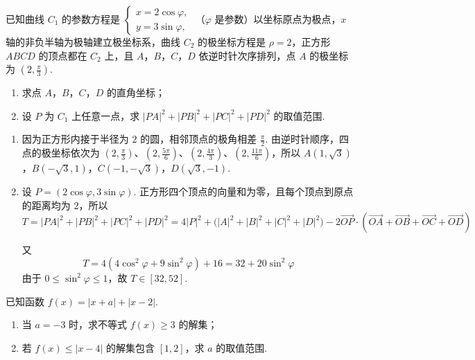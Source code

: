 \begin{problem}
已知曲线 \(C_1\) 的参数方程是 \(\begin{cases}
x = 2\cos \varphi,\\
y = 3\sin \varphi,
\end{cases}\) （\(\varphi\) 是参数）以坐标原点为极点，\(x\) 轴的非负半轴为极轴建立极坐标系，曲线 \(C_2\) 的极坐标方程是 \(\rho = 2\)，正方形 \(ABCD\) 的顶点都在 \(C_2\) 上，且 \(A\)，\(B\)，\(C\)，\(D\) 依逆时针次序排列，点 \(A\) 的极坐标为 \(\left(2, \frac{\pi}{3}\right)\).

\begin{enumerate}
\item 求点 \(A\)，\(B\)，\(C\)，\(D\) 的直角坐标；
\item 设 \(P\) 为 \(C_{1}\) 上任意一点，求 \(|PA|^{2} + |PB|^{2} + |PC|^{2} + |PD|^{2}\) 的取值范围.
\end{enumerate}
\end{problem}

\begin{solution}
\begin{enumerate}
\item 因为正方形内接于半径为 \(2\) 的圆，相邻顶点的极角相差 \(\frac\pi2\). 由逆时针顺序，四点的极坐标依次为 \(\left(2,\frac\pi3\right)\)、\(\left(2,\frac{5\pi}{6}\right)\)、\(\left(2,\frac{4\pi}{3}\right)\)、\(\left(2,\frac{11\pi}{6}\right)\)，所以 \(A(1,\sqrt3)\)，\(B(-\sqrt3,1)\)，\(C(-1,-\sqrt3)\)，\(D(\sqrt3,-1)\).
\item 设 \(P=(2\cos\varphi,3\sin\varphi)\). 正方形四个顶点的向量和为零，且每个顶点到原点的距离均为 \(2\)，所以
\[
T=|PA|^2+|PB|^2+|PC|^2+|PD|^2
 =4|P|^2+\bigl(|A|^2+|B|^2+|C|^2+|D|^2\bigr)-2\overrightarrow{OP}\cdot(\overrightarrow{OA}+\overrightarrow{OB}+\overrightarrow{OC}+\overrightarrow{OD})
\]

又
\[
T=4\left(4\cos^2\varphi+9\sin^2\varphi\right)+16=32+20\sin^2\varphi
\]
由于 \(0\leqslant\sin^2\varphi\leqslant1\)，故 \(T\in[32,52]\).
\end{enumerate}
\end{solution}

\begin{problem}
已知函数 \( f(x) = |x + a| + |x - 2| \).

\begin{enumerate}
\item 当 \(a = -3\) 时，求不等式 \( f(x) \geqslant 3 \) 的解集；
\item 若 \(f(x) \leqslant |x - 4|\) 的解集包含 \([1,2]\)，求 \(a\) 的取值范围.
\end{enumerate}
\end{problem}

